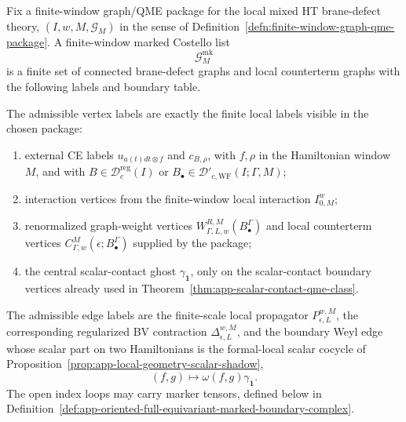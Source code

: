 \begin{defn}
\label{def:app-finite-window-marked-costello-list}
  Fix a finite-window graph/QME package for the local mixed HT
  brane-defect theory,
  \((I,w,M,\mathcal G_M)\) in the sense of
  Definition~\ref{defn:finite-window-graph-qme-package}.  A finite-window
  marked Costello list
  \[
    \mathcal G^{\mathrm{mk}}_M
  \]
  is a finite set of connected brane-defect graphs and local counterterm
  graphs with the following labels and boundary table.

  The admissible vertex labels are exactly the finite local labels visible
  in the chosen package:
  \begin{enumerate}[label=(L\arabic*)]
    \item external CE labels \(u_{a(t)dt\otimes f}\) and \(c_{B,\rho}\),
    with \(f,\rho\) in the Hamiltonian window \(M\), and with
    \(B\in\mathcal D^{\mathrm{reg}}_c(I)\) or
    \(B_\bullet\in\mathcal D'_{c,\mathrm{WF}}(I;\Gamma,M)\);
    \item interaction vertices from the finite-window local interaction
    \(I^w_{0,M}\);
    \item renormalized graph-weight vertices
    \(W^{R,M}_{\Gamma,L,w}(B^\Gamma_\bullet)\) and local counterterm
    vertices \(C^M_{\Gamma,w}(\epsilon;B^\Gamma_\bullet)\) supplied by
    the package;
    \item the central scalar-contact ghost \(\gamma_{\mathbf 1}\), only on
    the scalar-contact boundary vertices already used in
    Theorem~\ref{thm:app-scalar-contact-qme-class}.
  \end{enumerate}
  The admissible edge labels are the finite-scale local propagator
  \(P^{w,M}_{\epsilon,L}\), the corresponding regularized BV contraction
  \(\Delta^{w,M}_{\epsilon,L}\), and the boundary Weyl edge whose
  scalar part on two Hamiltonians is the formal-local scalar cocycle of
  Proposition~\ref{prop:app-local-geometry-scalar-shadow},
  \[
    (f,g)\longmapsto \omega(f,g)\gamma_{\mathbf 1}.
  \]
  The open index loops may carry marker tensors, defined below in
  Definition~\ref{def:app-oriented-full-equivariant-marked-boundary-complex}.


\end{defn}
